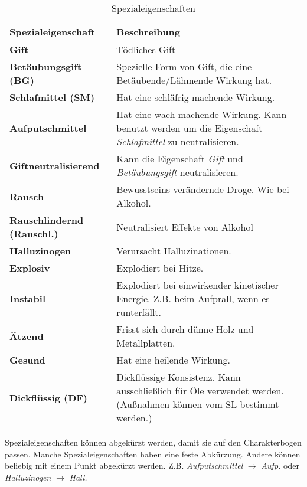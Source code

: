 \begin{table}[h]
\begin{center}
\begin{tabular}{|p{}|p{11cm}|}
\hline
\textbf{Spezialeigenschaft} & \textbf{Beschreibung} \\ \hline
\textbf{Gift} & Tödliches Gift \\ \hline
\textbf{Betäubungsgift (BG)} & Spezielle Form von Gift, die eine Betäubende/Lähmende Wirkung hat. \\ \hline
\textbf{Schlafmittel (SM)} & Hat eine schläfrig machende Wirkung. \\ \hline
\textbf{Aufputschmittel} & Hat eine wach machende Wirkung. Kann benutzt werden um die Eigenschaft \textit{Schlafmittel} zu neutralisieren. \\ \hline
\textbf{Giftneutralisierend} & Kann die Eigenschaft \textit{Gift} und \textit{Betäubungsgift} neutralisieren. \\ \hline
\textbf{Rausch} & Bewusstseins verändernde Droge. Wie bei Alkohol. \\ \hline
\textbf{Rauschlindernd (Rauschl.)} & Neutralisiert Effekte von Alkohol \\ \hline
\textbf{Halluzinogen} & Verursacht Halluzinationen. \\ \hline
\textbf{Explosiv} & Explodiert bei Hitze. \\ \hline
\textbf{Instabil} & Explodiert bei einwirkender kinetischer Energie. Z.B. beim Aufprall, wenn es runterfällt. \\ \hline
\textbf{Ätzend} & Frisst sich durch dünne Holz und Metallplatten. \\ \hline
\textbf{Gesund} & Hat eine heilende Wirkung. \\ \hline
\textbf{Dickflüssig (DF)} & Dickflüssige Konsistenz. Kann ausschließlich für Öle verwendet werden. (Außnahmen können vom SL bestimmt werden.)  \\ \hline
\end{tabular}
\end{center}
\caption{Spezialeigenschaften}
\label{tab:spezialeigenschaften}
\end{table}

Spezialeigenschaften können abgekürzt werden, damit sie auf den Charakterbogen passen. Manche Spezialeigenschaften haben eine feste Abkürzung. Andere können beliebig mit einem Punkt abgekürzt werden. Z.B. \textit{Aufputschmittel} $ \rightarrow $ \textit{Aufp.} oder \textit{Halluzinogen} $ \rightarrow $ \textit{Hall.}



